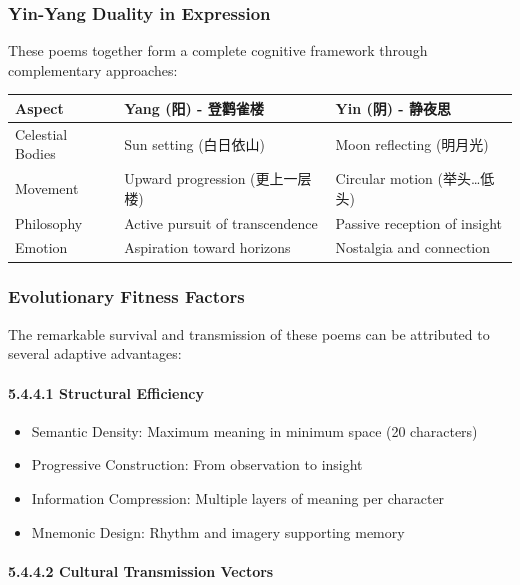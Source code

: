 \documentclass[11pt,letterpaper]{article}
\begin{document}
\subsubsection{Yin-Yang Duality in Expression}\label{yin-yang-duality-in-expression}

These poems together form a complete cognitive framework through
complementary approaches:

\begin{longtable}{|p{3cm}|p{5cm}|p{5cm}|}
\hline
\textbf{Aspect} & \textbf{Yang (阳) - 登鹳雀楼} & \textbf{Yin (阴) - 静夜思} \\
\hline
Celestial Bodies & Sun setting (白日依山) & Moon reflecting (明月光) \\
\hline
Movement & Upward progression (更上一层楼) & Circular motion
(举头\ldots 低头) \\
\hline
Philosophy & Active pursuit of transcendence & Passive reception of
insight \\
\hline
Emotion & Aspiration toward horizons & Nostalgia and connection \\
\hline
\end{longtable}

\subsubsection{Evolutionary Fitness Factors}\label{evolutionary-fitness-factors}

The remarkable survival and transmission of these poems can be
attributed to several adaptive advantages:

\paragraph{5.4.4.1 Structural
Efficiency}\label{structural-efficiency}

\begin{itemize}
\tightlist
\item
  Semantic Density: Maximum meaning in minimum space (20 characters)
\item
  Progressive Construction: From observation to insight
\item
  Information Compression: Multiple layers of meaning per character
\item
  Mnemonic Design: Rhythm and imagery supporting memory
\end{itemize}

\paragraph{5.4.4.2 Cultural Transmission
Vectors}\label{cultural-transmission-vectors}
\end{document}
